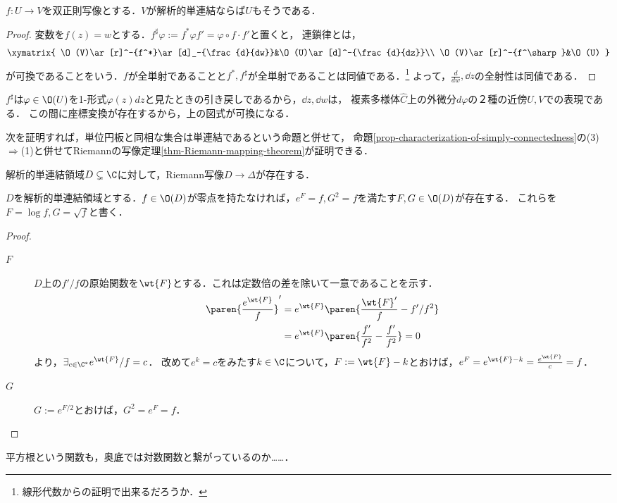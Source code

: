 \documentclass[uplatex, dvipdfmx]{jsreport}
\begin{document}
\begin{lemma}[解析的単連結性は双正則写像によって保たれる]
    $f:U\to V$を双正則写像とする．$V$が解析的単連結ならば$U$もそうである．
\end{lemma}
\begin{proof}
    変数を$f(z)=w$とする．$f^\sharp\varphi:=f^*\varphi f'=\varphi\circ f\cdot f'$と置くと，
    連鎖律とは，
    \[\xymatrix{
        \O(V)\ar[r]^-{f^*}\ar[d]_-{\frac{d}{dw}}&\O(U)\ar[d]^-{\frac{d}{dz}}\\
        \O(V)\ar[r]^-{f^\sharp}&\O(U)
    }\]
    が可換であることをいう．$f$が全単射であることと$f^*,f^\sharp$が全単射であることは同値である．\footnote{線形代数からの証明で出来るだろうか．}
    よって，$\frac{d}{dw},\dd{}{z}$の全射性は同値である．
\end{proof}
\begin{remarks}
    $f^\sharp$は$\varphi\in\O(U)$を1-形式$\varphi(z)dz$と見たときの引き戻しであるから，$\dd{}{z},\dd{}{w}$は，
    複素多様体$\hat{C}$上の外微分$d\varphi$の２種の近傍$U,V$での表現である．
    この間に座標変換が存在するから，上の図式が可換になる．
\end{remarks}

次を証明すれば，単位円板と同相な集合は単連結であるという命題と併せて，
命題\ref{prop-characterization-of-simply-connectedness}の(3)$\Rightarrow$(1)と併せてRiemannの写像定理\ref{thm-Riemann-mapping-theorem}が証明できる．
\begin{theorem}
    解析的単連結領域$D\subsetneq\C$に対して，Riemann写像$D\to\Delta$が存在する．
\end{theorem}
\begin{lemma}[logと平方根の存在]\label{lemma-existence-of-log}
    $D$を解析的単連結領域とする．$f\in\O(D)$が零点を持たなければ，$e^F=f,G^2=f$を満たす$F,G\in\O(D)$が存在する．
    これらを$F=\log f,G=\sqrt{f}$と書く．
\end{lemma}
\begin{proof}
    \begin{description}
        \item[$F$] $D$上の$f'/f$の原始関数を$\wt{F}$とする．これは定数倍の差を除いて一意であることを示す．
        \begin{align*}
            \paren{\frac{e^{\wt{F}}}{f}}'&=e^{\wt{F}}\paren{\frac{\wt{F}'}{f}-f'/f^2}\\
            &=e^{\wt{F}}\paren{\frac{f'}{f^2}-\frac{f'}{f^2}}=0
        \end{align*}
        より，$\exists_{c\in\C^*}e^{\wt{F}}/f=c$．
        改めて$e^k=c$をみたす$k\in\C$について，$F:=\wt{F}-k$とおけば，$e^F=e^{\wt{F}-k}=\frac{e^{\wt{F}}}{c}=f$．
        \item[$G$]
        $G:=e^{F/2}$とおけば，$G^2=e^F=f$．
    \end{description}
\end{proof}
\begin{remarks}
    平方根という関数も，奥底では対数関数と繋がっているのか……．
\end{remarks}
\end{document}
